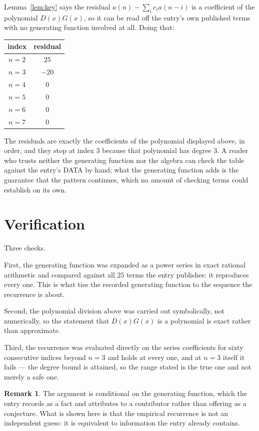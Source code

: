 \documentclass[11pt,a4paper]{article}
\theoremstyle{plain}
\theoremstyle{definition}
\newtheorem{remark}[theorem]{Remark}
\begin{document}
Lemma~\ref{lem:key} says the residual $a(n)-\sum_ic_ia(n-i)$ is a coefficient of the
polynomial $D(x)G(x)$, so it can be read off the entry's own published terms with no
generating function involved at all. Doing that:
\begin{center}
\begin{tabular}{cc}
index & residual \\ \hline
$n=2$ & $25$ \\
$n=3$ & $-20$ \\
$n=4$ & $0$ \\
$n=5$ & $0$ \\
$n=6$ & $0$ \\
$n=7$ & $0$
\end{tabular}
\end{center}
The residuals are exactly the coefficients of the polynomial displayed above, in order, and
they stop at index $3$ because that polynomial has degree $3$. A reader who trusts
neither the generating function nor the algebra can check the table against the entry's DATA
by hand; what the generating function adds is the guarantee that the pattern continues, which
no amount of checking terms could establish on its own.

\section{Verification}

Three checks.

First, the generating function was expanded as a power series in exact rational arithmetic and
compared against all $25$ terms the entry publishes: it reproduces every one. This is
what ties the recorded generating function to the sequence the recurrence is about.

Second, the polynomial division above was carried out symbolically, not numerically, so the
statement that $D(x)G(x)$ is a polynomial is exact rather than approximate.

Third, the recurrence was evaluated directly on the series coefficients for sixty consecutive
indices beyond $n=3$ and holds at every one, and at $n=3$ itself it fails --- the
degree bound is attained, so the range stated is the true one and not merely a safe one.

\begin{remark}
The argument is conditional on the generating function, which the entry records as a fact and
attributes to a contributor rather than offering as a conjecture. What is shown here is that
the empirical recurrence is not an independent guess: it is equivalent to information the
entry already contains.
\end{remark}
\end{document}
